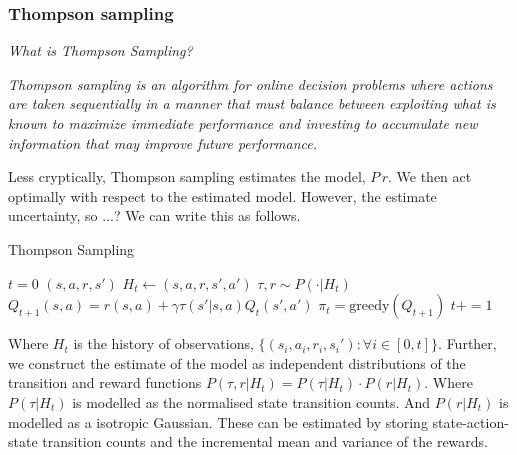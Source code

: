 
\subsubsection{Thompson sampling} \label{ts}
\begin{displayquote}
	\textsl{What is Thompson Sampling?}
\end{displayquote}

\begin{displayquote}
	\textit{Thompson sampling is an algorithm for online decision problems where actions are taken sequentially in a manner that
must balance between exploiting what is known to maximize immediate performance and investing to accumulate
new information that may improve future performance.}\cite{Russo2017}
\end{displayquote}

Less cryptically, Thompson sampling estimates the model, $P\, r$. We then act optimally with respect to the estimated model. However, the estimate uncertainty, so ...? We can write this as follows.

\begin{algorithm}
	\caption{Thompson Sampling}
	\begin{algorithmic}[1]

		\State $t=0$
		\State $(s, a, r, s')$ 
		\State $H_t \leftarrow (s, a, r, s', a')$ 
		\State $\tau, r \sim P(\cdot | H_t)$ 
		\State $Q_{t+1}(s, a) = r(s, a) + \gamma \tau(s'| s, a) Q_t(s', a')$ 
		\State $\pi_t = \text{greedy}(Q_{t+1})$ 
		\State $t += 1$

		\EndWhile
		\State {}
		\EndProcedure

	\end{algorithmic}
\end{algorithm}

Where $H_t$ is the history of observations, $\{(s_i, a_i, r_i, s_i') : \forall i \in [0, t]\}$.
Further, we construct the estimate of the model as independent distributions of the transition and reward functions $P(\tau, r | H_t) = P(\tau | H_t) \cdot P(r | H_t)$. Where $P(\tau | H_t)$
is modelled as the normalised state transition counts.
And $P(r | H_t)$ is modelled as a isotropic Gaussian.
These can be estimated by storing state-action-state transition counts
and the incremental mean and variance of the rewards.

